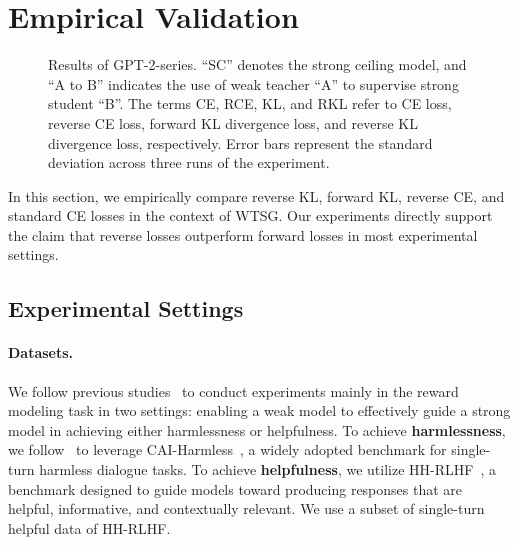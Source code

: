 \section{Empirical Validation}

\begin{figure*}[t]
\begin{center}
\caption{Results of GPT-2-series. ``SC'' denotes the strong ceiling model, and ``A to B'' indicates the use of weak teacher ``A'' to supervise strong student ``B''. The terms CE, RCE, KL, and RKL refer to CE loss, reverse CE loss, forward KL divergence loss, and reverse KL divergence loss, respectively. Error bars represent the standard deviation across three runs of the experiment.}
\label{fig:cai}
\end{center}
\vspace{-3pt}
\end{figure*}




In this section, we empirically compare reverse KL, forward KL, reverse CE, and standard CE losses in the context of WTSG. 
Our experiments directly support the claim that reverse losses outperform forward losses in most experimental settings.


\subsection{Experimental Settings}

\paragraph{Datasets.}
We follow previous studies~\citep{burns2023weak,yang2024super} to conduct experiments mainly in the reward modeling task in two settings: enabling a weak model to effectively guide a strong model in achieving either harmlessness or helpfulness. 
To achieve \textbf{harmlessness}, we follow~\citep{yang2024super} to leverage CAI-Harmless~\citep{bai2022constitutional}, a widely adopted benchmark for single-turn harmless dialogue tasks. 
To achieve \textbf{helpfulness}, we utilize HH-RLHF~\citep{bai2022training}, a benchmark designed to guide models toward producing responses that are helpful, informative, and contextually relevant. 
We use a subset of single-turn helpful data of HH-RLHF.

